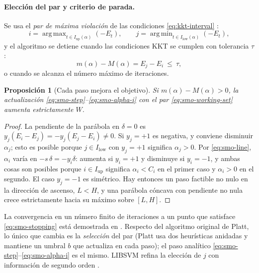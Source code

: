 \documentclass[11pt,a4paper]{article}
\DeclareMathOperator*{\argmax}{arg\,max}
\DeclareMathOperator*{\argmin}{arg\,min}
\theoremstyle{plain}
\newtheorem{proposicion}[teorema]{Proposición}
\theoremstyle{definition}
\theoremstyle{remark}
\numberwithin{equation}{section}
\begin{document}
\paragraph{Elección del par y criterio de parada.} Se usa el \emph{par de máxima violación}
de las condiciones \eqref{eq:kkt-interval} \cite{keerthi2001}:
\begin{equation}\label{eq:smo-working-set}
  i=\argmax_{t\in I_{\mathrm{up}}(\alpha)}(-E_t),\qquad
  j=\argmin_{t\in I_{\mathrm{low}}(\alpha)}(-E_t),
\end{equation}
y el algoritmo se detiene cuando las condiciones KKT se cumplen con tolerancia $\tau$:
\begin{equation}\label{eq:smo-stopping}
  m(\alpha)-M(\alpha)=E_j-E_i\ \le\ \tau ,
\end{equation}
o cuando se alcanza el número máximo de iteraciones.

\begin{proposicion}[Cada paso mejora el objetivo]
Si $m(\alpha)-M(\alpha)>0$, la actualización
\eqref{eq:smo-step}--\eqref{eq:smo-alpha-i} con el par \eqref{eq:smo-working-set} aumenta
estrictamente $W$.
\end{proposicion}
\begin{proof}
La pendiente de la parábola en $\delta=0$ es $y_j(E_i-E_j)=-y_j(E_j-E_i)\ne0$. Si $y_j=+1$
es negativa, y conviene disminuir $\alpha_j$; esto es posible porque $j\in I_{\mathrm{low}}$
con $y_j=+1$ significa $\alpha_j>0$. Por \eqref{eq:smo-line}, $\alpha_i$ varía en
$-s\,\delta=-y_i\delta$: aumenta si $y_i=+1$ y disminuye si $y_i=-1$, y ambas cosas son
posibles porque $i\in I_{\mathrm{up}}$ significa $\alpha_i<C_i$ en el primer caso y
$\alpha_i>0$ en el segundo. El caso $y_j=-1$ es simétrico. Hay entonces un paso factible no
nulo en la dirección de ascenso, $L<H$, y una parábola cóncava con pendiente no nula crece
estrictamente hacia su máximo sobre $[L,H]$.
\end{proof}

La convergencia en un número finito de iteraciones a un punto que satisface
\eqref{eq:smo-stopping} está demostrada en \cite{keerthigilbert2002,chen2006}. Respecto del
algoritmo original de Platt, lo único que cambia es la \emph{selección} del par (Platt usa
dos heurísticas anidadas y mantiene un umbral $b$ que actualiza en cada paso); el paso
analítico \eqref{eq:smo-step}--\eqref{eq:smo-alpha-i} es el mismo. LIBSVM \cite{libsvm}
refina la elección de $j$ con información de segundo orden \cite{fan2005}.

\end{document}
